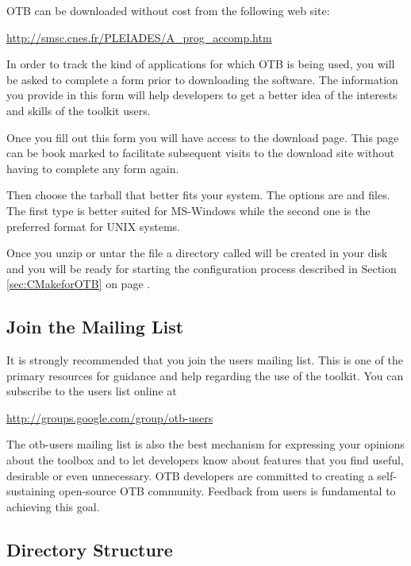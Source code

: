
OTB can be downloaded without cost from the following web site:
\begin{center} 
  \url{http://smsc.cnes.fr/PLEIADES/A_prog_accomp.htm}
\end{center}
In order to track the kind of applications for which OTB is being used, you
will be asked to complete a form prior to downloading the software.
The information you provide in this form will help developers to get a better
idea of the interests and skills of the toolkit users.

Once you fill out this form you will have access to the download
page. This page can be book marked to facilitate subsequent visits to
the download site without having to complete any form again.

 Then choose the tarball that better fits your system. The options
are  and  files.  The first type is better suited for
MS-Windows while the second one is the preferred format for UNIX systems.

Once you unzip or untar the file a directory called  will be
created in your disk and you will be ready for starting the configuration
process described in Section \ref{sec:CMakeforOTB} on page 
\pageref{sec:CMakeforOTB}.


\subsection{Join the Mailing List}
\label{sec:JoinMailList}


It is strongly recommended that you join the users mailing list. This is one
of the primary resources for guidance and help regarding the use of the 
toolkit. You can subscribe to the users list online at

\begin{center}
\url{http://groups.google.com/group/otb-users}
\end{center} 

The otb-users mailing list is also the best mechanism for expressing your
opinions about the toolbox and to let developers know about features that you
find useful, desirable or even unnecessary. OTB developers are committed to
creating a self-sustaining open-source OTB community. Feedback from users is
fundamental to achieving this goal.

\subsection{Directory Structure}
\label{sec:DirectoryStructure}

